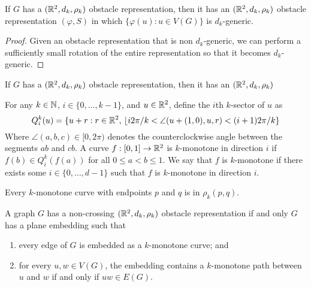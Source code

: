 \documentclass{patmorin}
\begin{document}
\begin{obs}
  If $G$ has a $(\mathbb{R}^2,d_k,\rho_k)$ obstacle representation, then it
  has an $(\mathbb{R}^2,d_k,\rho_k)$ obstacle representation $(\varphi, S)$
  in which $\{\varphi(u):u\in V(G)\}$ is $d_k$-generic.
\end{obs}

\begin{proof}
   Given an obstacle representation that is non $d_k$-generic, we can
   perform a sufficiently small rotation of the entire representation
   so that it becomes $d_k$-generic.
\end{proof}

\begin{obs}
  If $G$ has a $(\mathbb{R}^2,d_k,\rho_k)$ obstacle representation, then it has
  an $(\mathbb{R}^2,d_k,\rho_k)$ 
\end{obs}

For any $k\in\mathbb{N}$, $i\in\{0,\ldots,k-1\}$, and $u\in\mathbb{R}^2$, define
the $i$th $k$-sector of $u$ as
\[
Q^{k}_i(u) = \{ u+r: r\in\mathbb{R}^2,\,\lfloor i2\pi/k < \angle(u+(1,0),u,r) < (i+1)2\pi/k \}
\]
Where $\angle (a,b,c)\in[0,2\pi)$ denotes the counterclockwise angle
between the segments $ab$ and $cb$.  A curve $f:[0,1]\to\mathbb{R}^2$ is
$k$-monotone in direction $i$ if $f(b)\in Q^k_i(f(a))$ for all $0 \le
a < b \le 1$.  We say that $f$ is $k$-monotone if there exists some
$i\in\{0,\ldots,d-1\}$ such that $f$ is $k$-monotone in direction $i$.

\begin{obs}
   Every $k$-monotone curve with endpoints $p$ and $q$ is in $\rho_k(p,q)$.
\end{obs}

\begin{obs}
   A graph $G$ has a non-crossing $(\mathbb{R}^2,d_k,\rho_k)$ obstacle
   representation if and only $G$ has a plane embedding such that
\begin{enumerate}
   \item every edge of $G$ is embedded as a $k$-monotone curve; and
   \item for every $u,w\in V(G)$, the embedding contains a $k$-monotone path between $u$ and $w$ if and only if $uw\in E(G)$.
\end{enumerate}
\end{obs}
\end{document}
